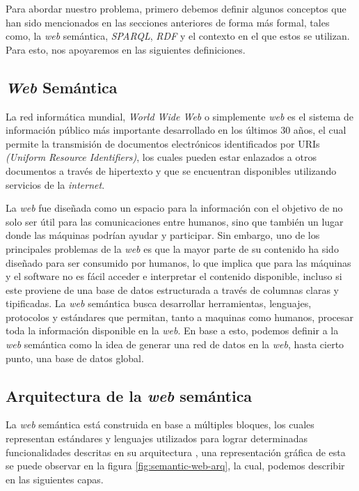 
Para abordar nuestro problema, primero debemos definir algunos conceptos que han sido mencionados en las secciones anteriores de forma más formal, tales como, la \textit{web} semántica, \textit{SPARQL}, \textit{RDF} y el contexto en el que estos se utilizan. Para esto, nos apoyaremos en las siguientes definiciones.

\subsection{\textit{Web} Semántica}

La red informática mundial, \textit{World Wide Web} o simplemente \textit{web} es el sistema de información público más importante desarrollado en los últimos 30 años, el cual permite la transmisión de documentos electrónicos identificados por URIs \textit{(Uniform Resource Identifiers)}, los cuales pueden estar enlazados a otros documentos a través de hipertexto y que se encuentran disponibles utilizando servicios de la \textit{internet}.

La \textit{web} fue diseñada como un espacio para la información con el objetivo de no solo ser útil para las comunicaciones entre humanos, sino que también un lugar donde las máquinas podrían ayudar y participar. Sin embargo, uno de los principales problemas de la \textit{web} es que la mayor parte de su contenido ha sido diseñado para ser consumido por humanos, lo que implica que para las máquinas y el software no es fácil acceder e interpretar el contenido disponible, incluso si este proviene de una base de datos estructurada a través de columnas claras y tipificadas. La \textit{web} semántica busca desarrollar herramientas, lenguajes, protocolos y estándares que permitan, tanto a maquinas como humanos, procesar toda la información disponible en la \textit{web}. En base a esto, podemos definir a la \textit{web} semántica como la idea de generar una red de datos en la \textit{web}, hasta cierto punto, una base de datos global. \cite{berners1998semantic}

\subsection{Arquitectura de la \textit{web} semántica}

La \textit{web} semántica está construida en base a múltiples bloques, los cuales representan estándares y lenguajes utilizados para lograr determinadas funcionalidades descritas en su arquitectura \cite{harth2011semantic}, una representación gráfica de esta se puede observar en la figura \ref{fig:semantic-web-arq}, la cual, podemos describir en las siguientes capas.

